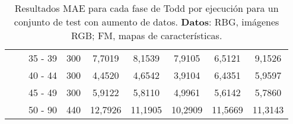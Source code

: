 \begin{table}[ht!]
{\begin{tabular}{|c|c|c|c|c|c|c|c|c|}
 &  & 35 - 39 & 300 & 7,7019 & 8,1539 & 7,9105 & 6,5121 & 9,1526 \\
 &  & 40 - 44 & 300 & 4,4520 & 4,6542 & 3,9104 & 6,4351 & 5,9597 \\
 &  & 45 - 49 & 300 & 5,9122 & 5,8110 & 4,9961 & 5,6142 & 5,7860 \\
 &  & 50 - 90 & 440 & 12,7926 & 11,1905 & 10,2909 & 11,5669 & 11,3143 \\ \hline
\end{tabular}%
}
\caption[Resultados MAE para cada fase de Todd por ejecución para un conjunto de test con aumento de datos.]{Resultados MAE para cada fase de Todd por ejecución para un conjunto de test con aumento de datos. \textbf{Datos}: RBG, imágenes RGB; FM, mapas de características.}
\label{tab:rtodd_c_mae}
\end{table}
\newpage
